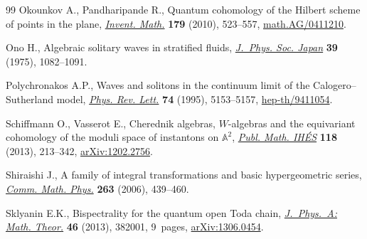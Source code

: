 \documentclass[11pt]{article}
\numberwithin{equation}{section}
\begin{document}
\begin{thebibliography}{99}
Okounkov A., Pandharipande R., Quantum cohomology of the {H}ilbert scheme of
  points in the plane, \href{http://dx.doi.org/10.1007/s00222-009-0223-5}{\textit{Invent. Math.}} \textbf{179} (2010), 523--557,
  \href{http://arxiv.org/abs/math.AG/0411210}{math.AG/0411210}.

Ono H., Algebraic solitary waves in stratif\/ied f\/luids, \href{http://dx.doi.org/10.1143/JPSJ.39.1082}{\textit{J.~Phys. Soc.
  Japan}} \textbf{39} (1975), 1082--1091.

Polychronakos A.P., Waves and solitons in the continuum limit of the
  {C}alogero--{S}utherland model, \href{http://dx.doi.org/10.1103/PhysRevLett.74.5153}{\textit{Phys. Rev. Lett.}} \textbf{74} (1995),
  5153--5157, \href{http://arxiv.org/abs/hep-th/9411054}{hep-th/9411054}.

Schif\/fmann O., Vasserot E., Cherednik algebras, $W$-algebras and the
  equivariant cohomology of the moduli space of instantons on $\mathbb{A}^2$,
  \href{http://dx.doi.org/10.1007/s10240-013-0052-3}{\textit{Publ. Math. IH\'ES}} \textbf{118} (2013), 213--342,
  \href{http://arxiv.org/abs/1202.2756}{arXiv:1202.2756}.

Shiraishi J., A family of integral transformations and basic hypergeometric
  series, \href{http://dx.doi.org/10.1007/s00220-005-1504-5}{\textit{Comm. Math. Phys.}} \textbf{263} (2006), 439--460.

Sklyanin E.K., Bispectrality for the quantum open Toda chain,
  \href{http://dx.doi.org/10.1088/1751-8113/46/38/382001}{\textit{J.~Phys.~A: Math. Theor.}} \textbf{46} (2013), 382001, 9~pages,
  \href{http://arxiv.org/abs/1306.0454}{arXiv:1306.0454}.

\end{thebibliography}
\end{document}
